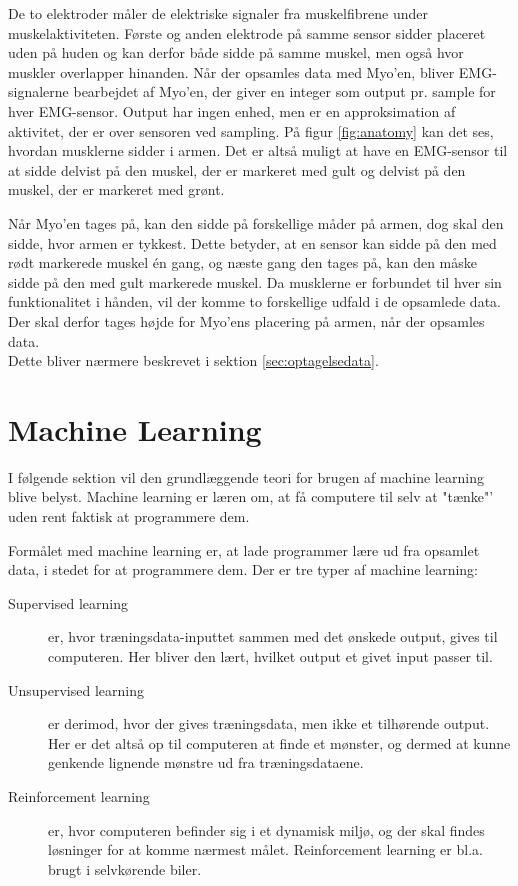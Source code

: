 De to elektroder måler de elektriske signaler fra muskelfibrene under muskelaktiviteten\citep{RefWorks:13}. Første og anden elektrode på samme sensor sidder placeret uden på huden og kan derfor både sidde på samme muskel, men også hvor muskler overlapper hinanden. Når der opsamles data med Myo'en, bliver EMG-signalerne bearbejdet af Myo'en, der giver en integer som output pr. sample for hver EMG-sensor. Output har ingen enhed, men er en approksimation af aktivitet, der er over sensoren ved sampling. På figur \ref{fig:anatomy} kan det ses, hvordan musklerne sidder i armen. Det er altså muligt at have en EMG-sensor til at sidde delvist på den muskel, der er markeret med gult og delvist på den muskel, der er markeret med grønt.


Når Myo'en tages på, kan den sidde på forskellige måder på armen, dog skal den sidde, hvor armen er tykkest. Dette betyder, at en sensor kan sidde på den med rødt markerede muskel én gang, og næste gang den tages på, kan den måske sidde på den med gult markerede muskel. Da musklerne er forbundet til hver sin funktionalitet i hånden, vil der komme to forskellige udfald i de opsamlede data. Der skal derfor tages højde for Myo'ens placering på armen, når der opsamles data.\\
Dette bliver nærmere beskrevet i sektion \ref{sec:optagelsedata}.

\section{Machine Learning}
\label{sec:machineLearning}
I følgende sektion vil den grundlæggende teori for brugen af machine learning blive belyst. Machine learning er læren om, at få computere til selv at "tænke"' uden rent faktisk at programmere dem.

Formålet med machine learning er, at lade programmer lære ud fra opsamlet data, i stedet for at programmere dem. Der er tre typer af machine learning\citep{PatternBishop}:
\begin{description}
	\item[Supervised learning] er, hvor træningsdata-inputtet sammen med det ønskede output, gives til computeren. Her bliver den lært, hvilket output et givet input passer til.
	\item[Unsupervised learning] er derimod, hvor der gives træningsdata, men ikke et tilhørende output. Her er det altså op til computeren at finde et mønster, og dermed at kunne genkende lignende mønstre ud fra træningsdataene.
	\item[Reinforcement learning] er, hvor computeren befinder sig i et dynamisk miljø, og der skal findes løsninger for at komme nærmest målet. Reinforcement learning er bl.a. brugt i selvkørende biler.
\end{description}

